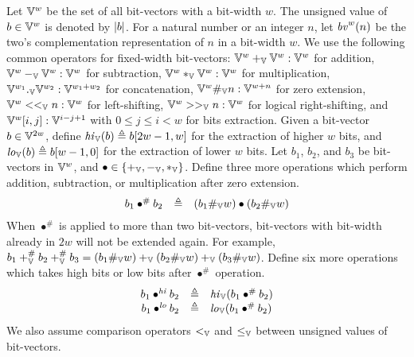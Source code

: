 Let $\mathbb{V}^w$ be the set of all bit-vectors with a bit-width $w$.
The unsigned value of $b \in \mathbb{V}^w$ is denoted by $|b|$.
For a natural number or an integer $n$, let $\mathit{bv}^w(n)$ be the two's complementation representation of $n$ in a bit-width $w$.
We use the following common operators for fixed-width bit-vectors: $\mathbb{V}^w +_{\mathbb{V}} \mathbb{V}^w : \mathbb{V}^w$ for addition, $\mathbb{V}^w -_{\mathbb{V}} \mathbb{V}^w : \mathbb{V}^w$ for subtraction, $\mathbb{V}^w *_{\mathbb{V}} \mathbb{V}^w : \mathbb{V}^w$ for multiplication, $\mathbb{V}^{w_1} ._{\mathbb{V}} \mathbb{V}^{w_2} : \mathbb{V}^{w_1 + w_2}$ for concatenation, $\mathbb{V}^w \#_{\mathbb{V}} n : \mathbb{V}^{w+n}$ for zero extension, $\mathbb{V}^w <<_{\mathbb{V}} n : \mathbb{V}^w$ for left-shifting, $\mathbb{V}^w >>_{\mathbb{V}} n : \mathbb{V}^w$ for logical right-shifting, and $\mathbb{V}^w[i,j] : \mathbb{V}^{i - j + 1}$ with $0 \leq j \leq i < w$ for bits extraction.
Given a bit-vector $b \in \mathbb{V}^{2w}$, define $\mathit{hi}_{\mathbb{V}}(b) \triangleq b[2w - 1, w]$ for the extraction of higher $w$ bits, and $\mathit{lo}_{\mathbb{V}}(b) \triangleq b[w - 1, 0]$ for the extraction of lower $w$ bits.
Let $b_1$, $b_2$, and $b_3$ be bit-vectors in $\mathbb{V}^{w}$, and $\bullet \in \{+_{\mathbb{V}}, -_{\mathbb{V}}, *_{\mathbb{V}}\}$.
Define three more operations which perform addition, subtraction, or multiplication after zero extension.
\[
\begin{array}{rcl}
b_1 \bullet^{\#} b_2 & \triangleq & (b_1 \#_{\mathbb{V}} w) \bullet (b_2 \#_{\mathbb{V}} w) \\
\end{array}
\]
When $\bullet^{\#}$ is applied to more than two bit-vectors, bit-vectors with bit-width already in $2w$ will not be extended again.
For example, $b_1 +_{\mathbb{V}}^{\#} b_2 +_{\mathbb{V}}^{\#} b_3 = (b_1 \#_{\mathbb{V}} w) +_{\mathbb{V}} (b_2 \#_{\mathbb{V}} w) +_{\mathbb{V}} (b_3 \#_{\mathbb{V}} w)$.
Define six more operations which takes high bits or low bits after $\bullet^{\#}$ operation.
\[
\begin{array}{rcl}
b_1 \bullet^{\mathit{hi}} b_2 & \triangleq & \mathit{hi}_{\mathbb{V}}(b_1 \bullet^{\#} b_2) \\
b_1 \bullet^{\mathit{lo}} b_2 & \triangleq & \mathit{lo}_{\mathbb{V}}(b_1 \bullet^{\#} b_2) \\
\end{array}
\]
We also assume comparison operators $<_{\mathbb{V}}$ and $\leq_{\mathbb{V}}$ between unsigned values of bit-vectors.


